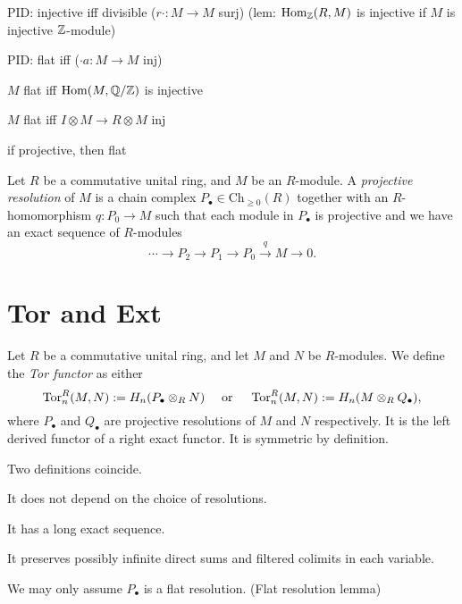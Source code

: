 \documentclass{../../large}
\begin{document}
PID: injective iff divisible ($r\cdot:M\to M$ surj) (lem: $\operatorname{Hom}_{\mathbb{Z}}(R,M)$ is injective if $M$ is injective $\mathbb{Z}$-module)

\begin{prb}
\begin{parts}
\item PID: flat iff ($\cdot a:M\to M$ inj)
\item $M$ flat iff $\operatorname{Hom}(M,\mathbb{Q}/\mathbb{Z})$ is injective
\item $M$ flat iff $I\otimes M\to R\otimes M$ inj
\item if projective, then flat
\end{parts}
\end{prb}


\begin{prb}
Let $R$ be a commutative unital ring, and $M$ be an $R$-module.
A \emph{projective resolution} of $M$ is a chain complex $P_\bullet\in\mathrm{Ch}_{\ge0}(R)$ together with an $R$-homomorphism $q:P_0\to M$ such that each module in $P_\bullet$ is projective and we have an exact sequence of $R$-modules
\[\cdots\to P_2\to P_1\to P_0\xrightarrow{q}M\to0.\]
\begin{parts}
\item
\end{parts}
\end{prb}





\section{Tor and Ext}


\begin{prb}
Let $R$ be a commutative unital ring, and let $M$ and $N$ be $R$-modules.
We define the \emph{Tor functor} as either
\[\operatorname{Tor}_n^R(M,N):=H_n(P_\bullet\otimes_RN)\quad\text{ or }\quad\operatorname{Tor}_n^R(M,N):=H_n(M\otimes_RQ_\bullet),\]
where $P_\bullet$ and $Q_\bullet$ are projective resolutions of $M$ and $N$ respectively.
It is the left derived functor of a right exact functor.
It is symmetric by definition.
\begin{parts}
\item Two definitions coincide.
\item It does not depend on the choice of resolutions.
\item It has a long exact sequence.
\item It preserves possibly infinite direct sums and filtered colimits in each variable.
\item We may only assume $P_\bullet$ is a flat resolution. (Flat resolution lemma)
\end{parts}
\end{prb}
\end{document}
